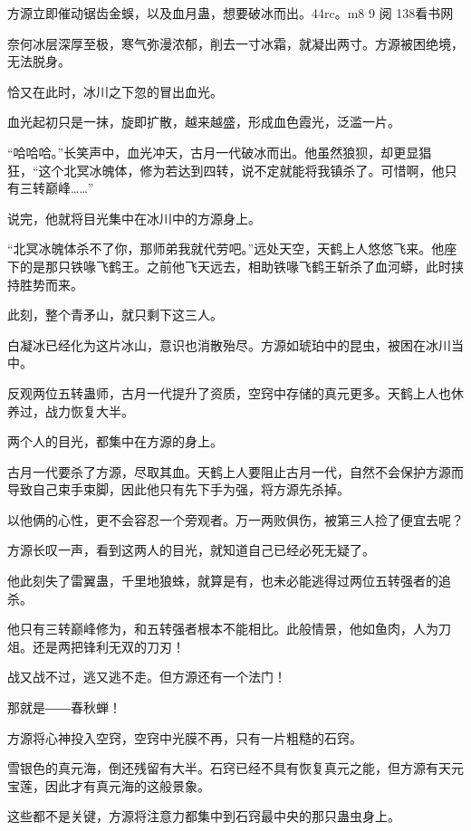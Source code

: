
\begin{this_body}

方源立即催动锯齿金蜈，以及血月蛊，想要破冰而出。44rc。m8 9 阅 138看书网

奈何冰层深厚至极，寒气弥漫浓郁，削去一寸冰霜，就凝出两寸。方源被困绝境，无法脱身。

恰又在此时，冰川之下忽的冒出血光。

血光起初只是一抹，旋即扩散，越来越盛，形成血色霞光，泛滥一片。

“哈哈哈。”长笑声中，血光冲天，古月一代破冰而出。他虽然狼狈，却更显猖狂，“这个北冥冰魄体，修为若达到四转，说不定就能将我镇杀了。可惜啊，他只有三转巅峰……”

说完，他就将目光集中在冰川中的方源身上。

“北冥冰魄体杀不了你，那师弟我就代劳吧。”远处天空，天鹤上人悠悠飞来。他座下的是那只铁喙飞鹤王。之前他飞天远去，相助铁喙飞鹤王斩杀了血河蟒，此时挟持胜势而来。

此刻，整个青矛山，就只剩下这三人。

白凝冰已经化为这片冰山，意识也消散殆尽。方源如琥珀中的昆虫，被困在冰川当中。

反观两位五转蛊师，古月一代提升了资质，空窍中存储的真元更多。天鹤上人也休养过，战力恢复大半。

两个人的目光，都集中在方源的身上。

古月一代要杀了方源，尽取其血。天鹤上人要阻止古月一代，自然不会保护方源而导致自己束手束脚，因此他只有先下手为强，将方源先杀掉。

以他俩的心性，更不会容忍一个旁观者。万一两败俱伤，被第三人捡了便宜去呢？

方源长叹一声，看到这两人的目光，就知道自己已经必死无疑了。

他此刻失了雷翼蛊，千里地狼蛛，就算是有，也未必能逃得过两位五转强者的追杀。

他只有三转巅峰修为，和五转强者根本不能相比。此般情景，他如鱼肉，人为刀俎。还是两把锋利无双的刀刃！

战又战不过，逃又逃不走。但方源还有一个法门！

那就是――春秋蝉！

方源将心神投入空窍，空窍中光膜不再，只有一片粗糙的石窍。

雪银色的真元海，倒还残留有大半。石窍已经不具有恢复真元之能，但方源有天元宝莲，因此才有真元海的这般景象。

这些都不是关键，方源将注意力都集中到石窍最中央的那只蛊虫身上。


\end{this_body}
